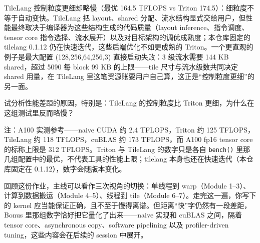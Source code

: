 \documentclass[11pt,a4paper,fontset=none]{ctexart}
\begin{document}
TileLang 控制粒度更细却略慢（最优 164.5 TFLOPS vs Triton 174.5）：细粒度不等于自动变快。TileLang 把 layout、shared 分配、流水结构显式交给用户，但性能最终取决于编译器为这些结构生成的代码质量（layout inference、指令调度、tensor core 指令选择、流水展开）以及对目标架构的调优成熟度；本仓库固定的 tilelang 0.1.12 仍在快速迭代，这些后端优化不如更成熟的 Triton。一个更直观的例子是最大配置 (128,256,64,256,3) 直接启动失败：3 级流水需要 144 KB shared，超过 5090 每 block 99 KB 的上限——tile 尺寸与流水级数共同决定 shared 用量，在 TileLang 里这笔资源账要用户自己算，这正是“控制粒度更细”的另一面。

试分析性能差距的原因，特别是：TileLang 的控制粒度比 Triton 更细，为什么在这组测试里反而略慢？

注：A100 实测参考——naive CUDA 约 2.4 TFLOPS，Triton 约 125 TFLOPS，TileLang 约 118 TFLOPS，cuBLAS 约 173 TFLOPS，而 A100 fp16 tensor core 的标称上限是 312 TFLOPS。Triton 与 TileLang 的数字只是各自 \texttt{bench()} 里那几组配置中的最优，不代表工具的性能上限；tilelang 本身也还在快速迭代（本仓库固定在 0.1.12），数字会随版本变化。
\begin{lookback}
  回顾这份作业，主线可以看作三次视角的切换：单线程到 warp（Module 1--3）、计算到数据搬运（Module 4--5）、线程到 tile（Module 6--7）。走完这一遍，你写下的 kernel 应当能保证正确，且不至于慢得离谱。但距离“快”字仍然有一段差距，Bonus 里那组数字恰好把它量化了出来——naive 实现和 cuBLAS 之间，隔着 tensor core、asynchronous copy、software pipelining 以及 profiler-driven tuning，这些内容会在后续的 session 中展开。
\end{lookback}
\end{document}
